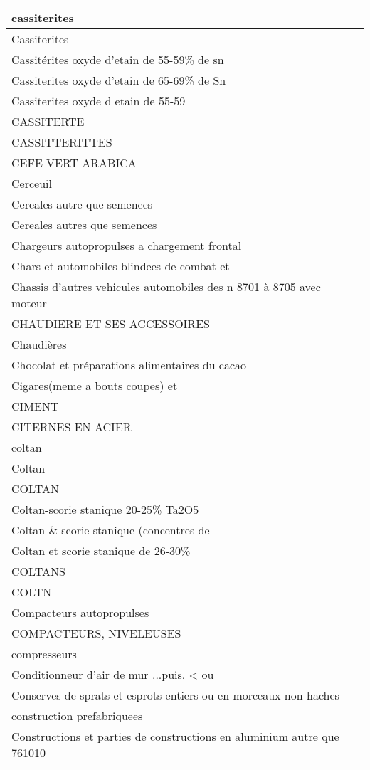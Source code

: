 \documentclass[
]{book}
\begin{document}
\begin{table}
\begin{tabular}[t]{l}
\hline
cassiterites\\
\hline
Cassiterites\\
\hline
Cassitérites oxyde d'etain de 55-59\% de sn\\
\hline
Cassiterites oxyde d'etain de 65-69\% de Sn\\
\hline
Cassiterites oxyde d etain de 55-59\\
\hline
CASSITERTE\\
\hline
CASSITTERITTES\\
\hline
CEFE VERT ARABICA\\
\hline
Cerceuil\\
\hline
Cereales autre que semences\\
\hline
Cereales autres que semences\\
\hline
Chargeurs autopropulses a chargement frontal\\
\hline
Chars et automobiles blindees de combat et\\
\hline
Chassis d'autres vehicules automobiles des n 8701 à 8705 avec moteur\\
\hline
CHAUDIERE ET SES ACCESSOIRES\\
\hline
Chaudières\\
\hline
Chocolat et préparations alimentaires du cacao\\
\hline
Cigares(meme a bouts coupes) et\\
\hline
CIMENT\\
\hline
CITERNES EN ACIER\\
\hline
coltan\\
\hline
Coltan\\
\hline
COLTAN\\
\hline
Coltan-scorie stanique 20-25\% Ta2O5\\
\hline
Coltan \& scorie stanique (concentres de\\
\hline
Coltan et scorie stanique de 26-30\%\\
\hline
COLTANS\\
\hline
COLTN\\
\hline
Compacteurs autopropulses\\
\hline
COMPACTEURS, NIVELEUSES\\
\hline
compresseurs\\
\hline
Conditionneur d'air de mur ...puis. < ou =\\
\hline
Conserves de sprats et esprots entiers ou en morceaux non haches\\
\hline
construction prefabriquees\\
\hline
Constructions et parties de constructions en aluminium autre que 761010\\

\end{tabular}
\end{table}
\end{document}
